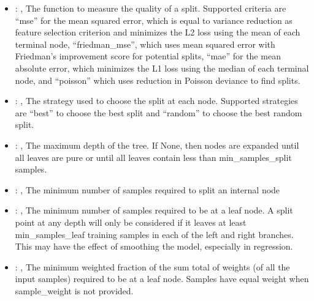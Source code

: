 \begin{itemize}
    \item {}: , 
      The function to measure the quality of a split. Supported criteria are ``mse'' for the mean
      squared error,                                                  which is equal to variance
      reduction as feature selection criterion and minimizes the L2 loss using the mean of each
      terminal node, ``friedman\_mse'', which uses mean squared error with Friedman's improvement
      score for potential splits,                                                  ``mae'' for the
      mean absolute error, which minimizes the L1 loss using the median of each terminal node, and
      ``poisson''                                                  which uses reduction in Poisson
      deviance to find splits.

    \item {}: , 
      The strategy used to choose the split at each node. Supported strategies are ``best''
      to choose the best split and ``random'' to choose the best random split.

    \item {}: , 
      The maximum depth of the tree. If None, then nodes are expanded until all leaves are pure
      or until all leaves contain less than min\_samples\_split samples.

    \item {}: , 
      The minimum number of samples required to split an internal node

    \item {}: , 
      The minimum number of samples required to be at a leaf node. A split point at any
      depth will only be considered if it leaves at least min\_samples\_leaf training samples in
      each                                                  of the left and right branches. This may
      have the effect of smoothing the model, especially
      in regression.

    \item {}: , 
      The minimum weighted fraction of the sum total of weights (of all the input samples)
      required to be at a leaf node. Samples have equal weight when sample\_weight is not provided.


\end{itemize}
